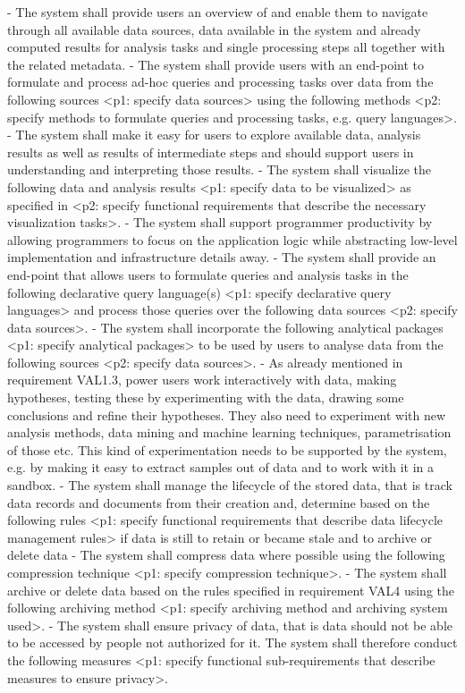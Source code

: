 \documentclass[conference]{IEEEtran}
\begin{document}
    - The system shall provide users an overview of and enable them to navigate
    through all available data sources, data available in the system and already
    computed results for analysis tasks and single processing steps all together
    with the related metadata.
    - The system shall provide users with an end-point to formulate and process
    ad-hoc queries and processing tasks over data from the following sources <p1:
    specify data sources> using the following methods <p2: specify methods to
    formulate queries and processing tasks, e.g. query languages>.
    - The system shall make it easy for users to explore available data, analysis
    results as well as results of intermediate steps and should support users in
    understanding and interpreting those results.
    - The system shall visualize the following data and analysis results <p1: specify
    data to be visualized> as specified in <p2: specify functional requirements
    that describe the necessary visualization tasks>.
    - The system shall support programmer productivity by allowing programmers
    to focus on the application logic while abstracting low-level implementation
    and infrastructure details away.
    - The system shall provide an end-point that allows users to formulate queries
    and analysis tasks in the following declarative query language(s) <p1: specify
    declarative query languages> and process those queries over the following data
    sources <p2: specify data sources>.
    - The system shall incorporate the following analytical packages <p1: specify
    analytical packages> to be used by users to analyse data from the following
    sources <p2: specify data sources>.
    - As already mentioned in requirement VAL1.3, power users work interactively
    with data, making hypotheses, testing these by experimenting with the data,
    drawing some conclusions and refine their hypotheses. They also need to
    experiment with new analysis methods, data mining and machine learning
    techniques, parametrisation of those etc. This kind of experimentation needs
    to be supported by the system, e.g. by making it easy to extract samples out
    of data and to work with it in a sandbox.
    - The system shall manage the lifecycle of the stored data, that is track data
    records and documents from their creation and, determine based on the following rules <p1: specify functional requirements that describe data lifecycle
    management rules> if data is still to retain or became stale and to archive or
    delete data
    - The system shall compress data where possible using the following compression
    technique <p1: specify compression technique>.
    - The system shall archive or delete data based on the rules specified in requirement VAL4 using the following archiving method <p1: specify archiving
    method and archiving system used>.
    - The system shall ensure privacy of data, that is data should not be able to be
    accessed by people not authorized for it. The system shall therefore conduct
    the following measures <p1: specify functional sub-requirements that describe
    measures to ensure privacy>.
    


\end{document}
